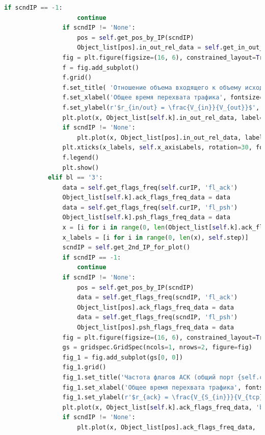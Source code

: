 \documentclass[spec, och, diploma]{SCWorks}
\begin{document}
\begin{lstlisting}[language=Python]
                if scndIP == -1:
                    continue
                if scndIP != 'None':
                    pos = self.get_pos_by_IP(scndIP)
                    Object_list[pos].in_out_rel_data = self.get_in_out_rel(scndIP)
                fig = plt.figure(figsize=(16, 6), constrained_layout=True)
                f = fig.add_subplot()
                f.grid()
                f.set_title( 'Отношение объема входящего к объему исходящего трафиков (общий порт {self.curPort})', fontsize=15 )
                f.set_xlabel('Общее время перехвата трафика', fontsize=15)
                f.set_ylabel(r'$r_{in/out} = \frac{V_{in}}{V_{out}}$', fontsize=15)
                plt.plot(x, Object_list[self.k].in_out_rel_data, label=self.curIP)
                if scndIP != 'None':
                    plt.plot(x, Object_list[pos].in_out_rel_data, label=scndIP)
                plt.xticks(x_labels, self.x_axisLabels, rotation=30, fontsize=10)
                f.legend()
                plt.show()
            elif bl == '3':
                data = self.get_flags_freq(self.curIP, 'fl_ack')
                Object_list[self.k].ack_flags_freq_data = data
                data = self.get_flags_freq(self.curIP, 'fl_psh')
                Object_list[self.k].psh_flags_freq_data = data
                x = [i for i in range(0, len(Object_list[self.k].ack_flags_freq_data))]
                x_labels = [i for i in range(0, len(x), self.step)]
                scndIP = self.get_2nd_IP_for_plot()
                if scndIP == -1:
                    continue
                if scndIP != 'None':
                    pos = self.get_pos_by_IP(scndIP)
                    data = self.get_flags_freq(scndIP, 'fl_ack')
                    Object_list[pos].ack_flags_freq_data = data
                    data = self.get_flags_freq(scndIP, 'fl_psh')
                    Object_list[pos].psh_flags_freq_data = data
                fig = plt.figure(figsize=(16, 6), constrained_layout=True)
                gs = gridspec.GridSpec(ncols=1, nrows=2, figure=fig)
                fig_1 = fig.add_subplot(gs[0, 0])
                fig_1.grid()
                fig_1.set_title('Частота флагов ACK (общий порт {self.curPort})', fontsize=15 )
                fig_1.set_xlabel('Общее время перехвата трафика', fontsize=15)
                fig_1.set_ylabel(r'$r_{ack} = \frac{V_{S_{in}}}{V_{tcp}}$', fontsize=15)
                plt.plot(x, Object_list[self.k].ack_flags_freq_data, 'b', label=self.curIP)
                if scndIP != 'None':
                    plt.plot(x, Object_list[pos].ack_flags_freq_data, 'r', label=scndIP)

\end{lstlisting}
\end{document}
